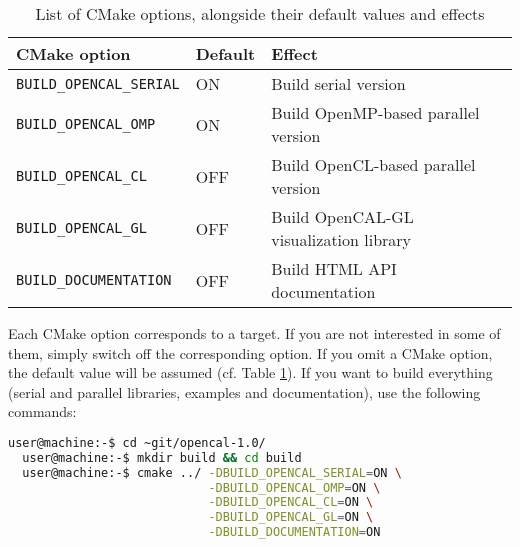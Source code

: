 \begin{table}[h]
  \centering
  \caption{List of CMake options, alongside their default values and
    effects}
  \label{ch:installation:cmakeoptions}
  \begin{tabular}{lll}
    \hline
    CMake option &  Default & Effect\\
    \hline
    \texttt{BUILD\_OPENCAL\_SERIAL} & ON  & Build serial version\\
    \texttt{BUILD\_OPENCAL\_OMP}    & ON  & Build OpenMP-based parallel version\\
    \texttt{BUILD\_OPENCAL\_CL}     & OFF & Build OpenCL-based parallel version\\
    \texttt{BUILD\_OPENCAL\_GL}     & OFF & Build OpenCAL-GL visualization library\\
    \texttt{BUILD\_DOCUMENTATION}   & OFF & Build HTML API documentation\\
     \hline
  \end{tabular}
\end{table}

Each CMake option corresponds to a target. If you are not interested
in some of them, simply switch off the corresponding option. If you
omit a CMake option, the default value will be assumed (cf. Table
\ref{ch:installation:cmakeoptions}). If you want to build everything
(serial and parallel libraries, examples and documentation), use the
following commands:

\begin{lstlisting}[numbers=none,language=bash,label={ch:quickstart:simplebuild}]
  user@machine:-$ cd ~git/opencal-1.0/
  user@machine:-$ mkdir build && cd build
  user@machine:-$ cmake ../ -DBUILD_OPENCAL_SERIAL=ON \
                            -DBUILD_OPENCAL_OMP=ON \
                            -DBUILD_OPENCAL_CL=ON \
                            -DBUILD_OPENCAL_GL=ON \
                            -DBUILD_DOCUMENTATION=ON
\end{lstlisting}


